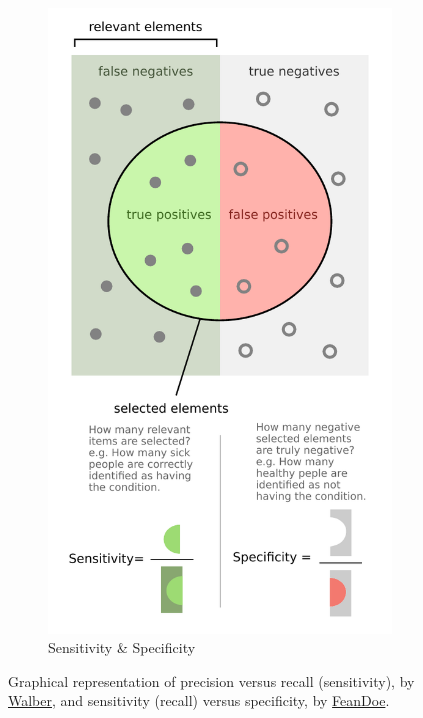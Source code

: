 \begin{figure}[H]
\begin{subfigure}[c]{0.48\textwidth}
  \includegraphics[width=\textwidth]{figures/ml/sensitivity_and_specificity}
  \caption{Sensitivity \& Specificity}
  \label{fig:graphical_CM_quantities:sensitivity_specificity}
  \end{subfigure}
\caption{
Graphical representation of
precision versus recall (sensitivity), by \href{https://commons.wikimedia.org/wiki/File:Precisionrecall.svg}{Walber},
and
sensitivity (recall) versus specificity, by \href{http://en.wikipedia.org/wiki/File:Sensitivity_and_specificity.svg}{FeanDoe}.
}
\label{fig:graphical_CM_quantities}
\end{figure}

